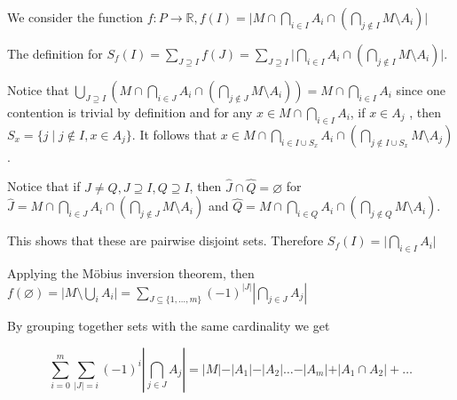\documentclass[12pt]{article}
\begin{document}
\begin{enumerate}
\begin{center}
    \end{center}
    
    We consider the function $f: P \rightarrow \mathbb{R}, f(I) = \vert M \cap \bigcap\limits_{i \in I}A_i \cap (\bigcap\limits_{j \notin I}M \setminus A_i)\vert $
    
    The definition for $S_f(I) = \displaystyle\sum\limits_{J \supseteq I} f(J) = \displaystyle\sum\limits_{J \supseteq I} \vert \bigcap\limits_{i \in I}A_i \cap(\bigcap\limits_{j \notin I} M \setminus A_i)\vert$.
    
    Notice that $\displaystyle\bigcup\limits_{J \supseteq I} ( M \cap \bigcap\limits_{i \in J}A_i \cap (\bigcap\limits_{j \notin J}M \setminus A_i)) = M \cap \bigcap \limits_{i\in I} A_i$ since one contention is trivial by definition and for any $x \in M \cap \displaystyle\bigcap \limits_{i \in I} A_i$, if $x \in A_j$ , then $S_x = \{ j \; \vert \; j \notin I, x \in A_j \}$. It follows that $x \in M \cap \bigcap\limits_{i \in I \cup S_x} A_i \cap (\bigcap\limits_{j \notin I \cup S_x} M \setminus A_j)$.
    
    Notice that if $J \neq Q, J \supseteq I, Q \supseteq I$, then $\hat J \cap \hat Q = \varnothing$ for $\hat J = M \cap \bigcap\limits_{i \in J}A_i \cap (\bigcap\limits_{j \notin J}M \setminus A_i) $ and $\hat Q = M \cap \bigcap\limits_{i \in Q}A_i \cap (\bigcap\limits_{j \notin Q}M \setminus A_i)$. 
    
    This shows that these are pairwise disjoint sets. Therefore $S_f(I) = \vert \bigcap\limits_{i \in I} A_i \vert$
    
    Applying the Möbius inversion theorem, then $f(\varnothing) = \vert M \setminus \bigcup\limits_{i} A_i \vert = \displaystyle \sum \limits_{J \subseteq\{1,\ldots,m\}} (-1)^{\vert J \vert} \left \vert \bigcap\limits_{j \in J}A_j \right\vert$
    
    By grouping together sets with the same cardinality we get 
    
    $$\displaystyle \sum \limits_{i=0 }^{m} \sum\limits_{\vert J \vert = i} (-1)^i \left \vert \bigcap_{j \in J } A_j\right \vert  = \vert M \vert - \vert A_1 \vert - \vert A_2 \vert \ldots - \vert A_m \vert + \vert A_1 \cap A_2\vert + \ldots$$
    \end{enumerate}
\end{document}
